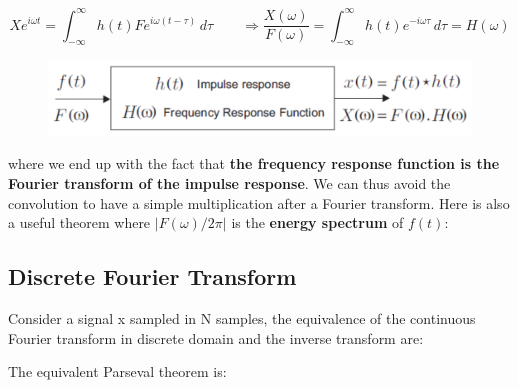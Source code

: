 			\begin{equation}
			Xe^{i\omega t} = \int _{-\infty}^\infty h(t)Fe^{i\omega (t-\tau)} \, d\tau \qquad \Rightarrow \frac{X(\omega)}{F(\omega)} = \int _{-\infty}^\infty h(t)e^{-i\omega \tau} \, d\tau = H(\omega)
			\end{equation}
			
			\begin{figure}
			\vspace{-5mm}
			\includegraphics[scale=0.3]{ch1/11}
			\end{figure}
			where we end up with the fact that \textbf{the frequency response function is the Fourier transform of the impulse response}. We can thus avoid the convolution to have a simple multiplication after a Fourier transform. Here is also a useful theorem where $|F(\omega)/2\pi |$ is the \textbf{energy spectrum} of $f(t)$: 
			
			\begin{center}
			\end{center}
			
		\subsection{Discrete Fourier Transform}
			Consider a signal x sampled in N samples, the equivalence of the continuous Fourier transform in discrete domain and the inverse transform are:
			
			\begin{center}
			\end{center}
			
			The equivalent Parseval theorem is:
			
